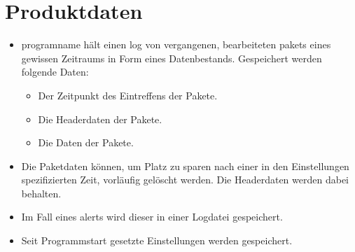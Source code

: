 \chapter{Produktdaten}


\begin{itemize}
  \item \gls{programname} hält einen \gls{log} von vergangenen, bearbeiteten \glspl{paket} eines gewissen Zeitraums in Form eines Datenbestands. Gespeichert werden folgende Daten:

  \begin{itemize}
    \item Der Zeitpunkt des Eintreffens der Pakete.
    \item Die Headerdaten der Pakete.
    \item Die Daten der Pakete.
    \end{itemize}
  \item Die Paketdaten können, um Platz zu sparen nach einer in den Einstellungen spezifizierten Zeit, vorläufig gelöscht werden. Die Headerdaten werden dabei behalten.
  \item Im Fall eines \glspl{alert} wird dieser in einer Logdatei gespeichert.
  \item Seit Programmstart gesetzte Einstellungen werden gespeichert.
\end{itemize}